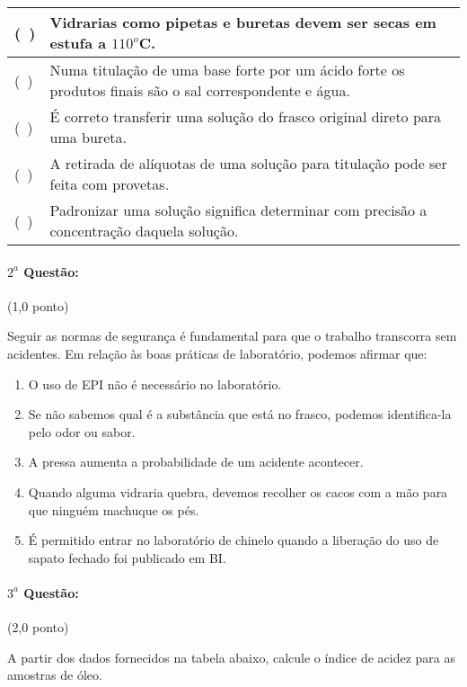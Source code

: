\documentclass[12pt,a4paper]{article}
\begin{document}
\begin{center}
\begin{tabular}{|l|l|}
\hline 
(\ ) & \footnotesize{Vidrarias como pipetas e buretas devem ser secas em estufa a $110^o$C}. \\ \hline
(\ ) & \footnotesize{Numa titulação de uma base forte por um ácido forte os produtos finais são o sal correspondente e água.} \\ \hline
(\ ) & \footnotesize{É correto transferir uma solução do frasco original direto para uma bureta.} \\ \hline
(\ ) & \footnotesize{A retirada de alíquotas de uma solução para titulação pode ser feita com provetas}. \\ \hline
(\ ) & \footnotesize{Padronizar uma solução significa determinar com precisão a concentração daquela solução.} \\ \hline
\end{tabular}
\end{center}

\paragraph{$2^a$ Questão:} (1,0 ponto)

Seguir as normas de segurança é fundamental para que o trabalho transcorra sem acidentes. Em relação às boas práticas de laboratório, 
podemos afirmar que:
\begin{enumerate}[label=\alph*)]
\item O uso de EPI não é necessário no laboratório.
\item Se não sabemos qual é a substância que está no frasco, podemos identifica-la pelo odor ou sabor.
\item A pressa aumenta a probabilidade de um acidente acontecer.
\item Quando alguma vidraria quebra, devemos recolher os cacos com a mão para que ninguém machuque os pés.
\item É permitido entrar no laboratório de chinelo quando a liberação do uso de sapato fechado foi publicado em BI.
\end{enumerate}

\paragraph{$3^a$ Questão:} (2,0 ponto)

A partir dos dados fornecidos na tabela abaixo, calcule o índice de acidez para as amostras de óleo. 
\end{document}
